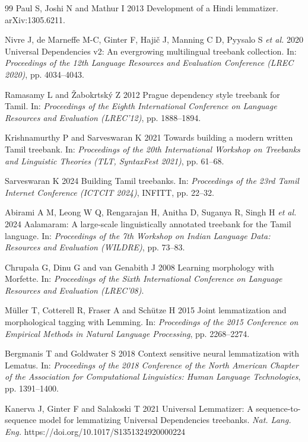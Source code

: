 \documentclass{sadhana}
\begin{document}
\begin{thebibliography}{99}
Paul S, Joshi N and Mathur I 2013 Development of a Hindi lemmatizer.
arXiv:1305.6211.

Nivre J, de Marneffe M-C, Ginter F, Hajič J, Manning C D, Pyysalo S
\emph{et al.} 2020 Universal Dependencies v2: An evergrowing multilingual
treebank collection. In: \emph{Proceedings of the 12th Language Resources and
Evaluation Conference (LREC 2020)}, pp. 4034--4043.

Ramasamy L and Žabokrtský Z 2012 Prague dependency style treebank for Tamil.
In: \emph{Proceedings of the Eighth International Conference on Language
Resources and Evaluation (LREC'12)}, pp. 1888--1894.

Krishnamurthy P and Sarveswaran K 2021 Towards building a modern written Tamil
treebank. In: \emph{Proceedings of the 20th International Workshop on
Treebanks and Linguistic Theories (TLT, SyntaxFest 2021)}, pp. 61--68.

Sarveswaran K 2024 Building Tamil treebanks. In: \emph{Proceedings of the 23rd
Tamil Internet Conference (ICTCIT 2024)}, INFITT, pp. 22--32.

Abirami A M, Leong W Q, Rengarajan H, Anitha D, Suganya R, Singh H \emph{et al.}
2024 Aalamaram: A large-scale linguistically annotated treebank for the Tamil
language. In: \emph{Proceedings of the 7th Workshop on Indian Language Data:
Resources and Evaluation (WILDRE)}, pp. 73--83.

Chrupała G, Dinu G and van Genabith J 2008 Learning morphology with Morfette.
In: \emph{Proceedings of the Sixth International Conference on Language
Resources and Evaluation (LREC'08)}. %

Müller T, Cotterell R, Fraser A and Schütze H 2015 Joint lemmatization and
morphological tagging with Lemming. In: \emph{Proceedings of the 2015
Conference on Empirical Methods in Natural Language Processing},
pp. 2268--2274.

Bergmanis T and Goldwater S 2018 Context sensitive neural lemmatization with
Lematus. In: \emph{Proceedings of the 2018 Conference of the North American
Chapter of the Association for Computational Linguistics: Human Language
Technologies}, pp. 1391--1400. %

Kanerva J, Ginter F and Salakoski T 2021 Universal Lemmatizer: A
sequence-to-sequence model for lemmatizing Universal Dependencies treebanks.
\emph{Nat. Lang. Eng.} https://doi.org/10.1017/S1351324920000224 %


\end{thebibliography}
\end{document}
